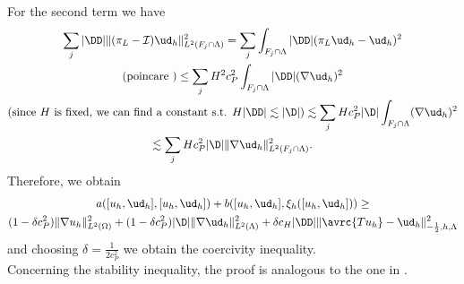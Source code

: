 For the second term we have
\begin{multline*}
\sum _j |\DD|\|(\pi_L - \mathcal{I}){\ud}_h\|^2_{L^2(F_j\cap \Lambda)} = \sum _j \int_{F_j\cap \Lambda} |\DD| (\pi_L {\ud}_h -{\ud}_h)^2
\\
(\text{poincare })\leq \sum _j  H^2 c_P^2 \int_{F_j\cap \Lambda} |\DD|(\nabla {\ud}_h)^2
\\
(\text{since $H$ is fixed, we can find a constant s.t. } H|\DD| \lesssim |\D|) \lesssim \sum _j H c_P^2 |\D| \int_{F_j\cap \Lambda} (\nabla {\ud}_h)^2 
\\
\lesssim \sum _j H c_P^2 |\D| \|\nabla {\ud}_h\|^2_{L^2(F_j\cap \Lambda)}.
\end{multline*}
Therefore, we obtain
\begin{multline*}
a([u_h, {\ud}_h],[u_h, {\ud}_h] ) + b([u_h, {\ud}_h], \xi_h([u_h, {\ud}_h]))
\geq \\
(1-\delta c_P^2) \|\nabla u_h\|^2_{L^2(\Omega)} + (1- \delta c_P^2) |\D|\|\nabla {\ud}_h\|^2_{L^2(\Lambda)}
+\delta c_H |\DD| \|\avrc{Tu_h}-{\ud}_h\|^2_{-\frac 12,h,\Lambda}
\end{multline*}
and choosing $\delta=\frac{1}{2c_P^2}$ we obtain the coercivity inequality.\\
Concerning the stability inequality, the proof is analogous to the one in \cite{burman2014}.

